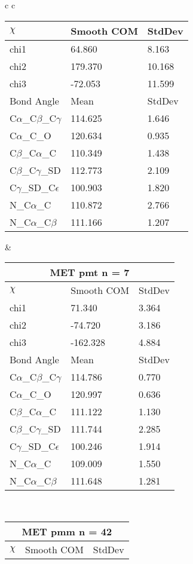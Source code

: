 \begin{longtable}{ c c }
\begin{tabular}{ l l l }
  $\chi$       & Smooth COM & StdDev \\ \midrule
  chi1 & 64.860 & 8.163 \\ 
  chi2 & 179.370 & 10.168 \\ 
  chi3 & -72.053 & 11.599 \\ \midrule
  Bond Angle   & Mean     & StdDev \\ \midrule
  C$\alpha$\_C$\beta$\_C$\gamma$ & 114.625 & 1.646\\
  C$\alpha$\_C\_O & 120.634 & 0.935\\
  C$\beta$\_C$\alpha$\_C & 110.349 & 1.438\\
  C$\beta$\_C$\gamma$\_SD & 112.773 & 2.109\\
  C$\gamma$\_SD\_C$\epsilon$ & 100.903 & 1.820\\
  N\_C$\alpha$\_C & 110.872 & 2.766\\
  N\_C$\alpha$\_C$\beta$ & 111.166 & 1.207\\
  \bottomrule
  \end{tabular}
  &
  \begin{tabular}{ l l l }
  \toprule
  \multicolumn{3}{c}{MET \textbf{pmt} n = 7} \\ \toprule
  $\chi$       & Smooth COM & StdDev \\ \midrule
  chi1 & 71.340 & 3.364 \\ 
  chi2 & -74.720 & 3.186 \\ 
  chi3 & -162.328 & 4.884 \\ \midrule
  Bond Angle   & Mean     & StdDev \\ \midrule
  C$\alpha$\_C$\beta$\_C$\gamma$ & 114.786 & 0.770\\
  C$\alpha$\_C\_O & 120.997 & 0.636\\
  C$\beta$\_C$\alpha$\_C & 111.122 & 1.130\\
  C$\beta$\_C$\gamma$\_SD & 111.744 & 2.285\\
  C$\gamma$\_SD\_C$\epsilon$ & 100.246 & 1.914\\
  N\_C$\alpha$\_C & 109.009 & 1.550\\
  N\_C$\alpha$\_C$\beta$ & 111.648 & 1.281\\
  \bottomrule
  \end{tabular}
  \\
  \begin{tabular}{ l l l }
  \toprule
  \multicolumn{3}{c}{MET \textbf{pmm} n = 42} \\ \toprule
  $\chi$       & Smooth COM & StdDev \\ \midrule

\end{tabular}
\end{longtable}
